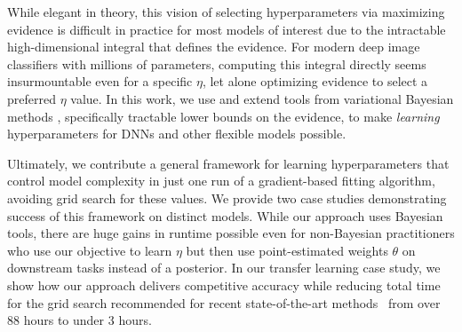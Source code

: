 \let\thefootnote\relax{}

While elegant in theory, this vision of selecting hyperparameters via maximizing evidence is difficult in practice for most models of interest due to the intractable high-dimensional integral that defines the evidence. For modern deep image classifiers with millions of parameters, computing this integral directly seems insurmountable even for a specific $\eta$, let alone optimizing evidence to select a preferred $\eta$ value. In this work, we use and extend tools from variational Bayesian methods \citep{jordan1999introduction,blei2017variational}, specifically tractable lower bounds on the evidence, to make \emph{learning} hyperparameters for DNNs and other flexible models possible.

Ultimately, we contribute a general framework for learning hyperparameters that control model complexity in just one run of a gradient-based fitting algorithm, avoiding grid search for these values.
We provide two case studies demonstrating success of this framework on distinct models.
While our approach uses Bayesian tools, there are huge gains in runtime possible even for non-Bayesian practitioners who use our objective to learn $\eta$ but then use point-estimated weights $\theta$ on downstream tasks instead of a posterior.
In our transfer learning case study, we show how our approach delivers competitive accuracy while reducing total time for the grid search recommended for recent state-of-the-art methods~\citep{xuhong2018explicit,shwartz2022pre} from over 88 hours to under 3 hours.



